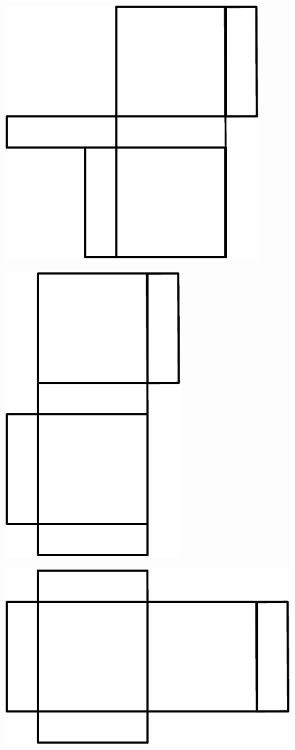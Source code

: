 \documentclass[a4paper,11pt]{report}
\begin{document}
\begin{exop}
{\begin{tasks}
			\includegraphics[scale=0.4]{media/es-20/pl5}
		\task

			\includegraphics[scale=0.4,angle=90]{media/es-20/pl6}
		\task

			\includegraphics[scale=0.4]{media/es-20/pl7}
		\task


\end{tasks}}
\end{exop}
\end{document}
